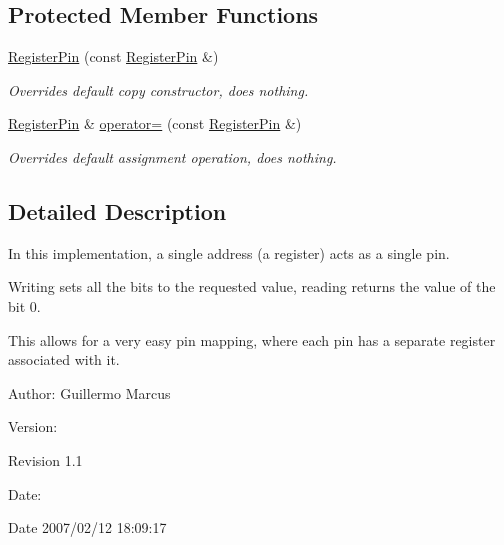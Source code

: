 \subsection*{Protected Member Functions}
\begin{CompactItemize}
\item 
\hyperlink{classmprace_1_1RegisterPin_b0}{Register\-Pin} (const \hyperlink{classmprace_1_1RegisterPin}{Register\-Pin} \&)
\begin{CompactList}\small\item\em Overrides default copy constructor, does nothing. \item\end{CompactList}\item 
\hyperlink{classmprace_1_1RegisterPin}{Register\-Pin} \& \hyperlink{classmprace_1_1RegisterPin_b1}{operator=} (const \hyperlink{classmprace_1_1RegisterPin}{Register\-Pin} \&)
\begin{CompactList}\small\item\em Overrides default assignment operation, does nothing. \item\end{CompactList}\end{CompactItemize}


\subsection{Detailed Description}
In this implementation, a single address (a register) acts as a single pin. 

Writing sets all the bits to the requested value, reading returns the value of the bit 0.

This allows for a very easy pin mapping, where each pin has a separate register associated with it.

\begin{Desc}
\item[Author:]Guillermo Marcus \end{Desc}
\begin{Desc}
\item[Version:]\begin{Desc}
\item[Revision]1.1 \end{Desc}
\end{Desc}
\begin{Desc}
\item[Date:]\begin{Desc}
\item[Date]2007/02/12 18:09:17 \end{Desc}
\end{Desc}




